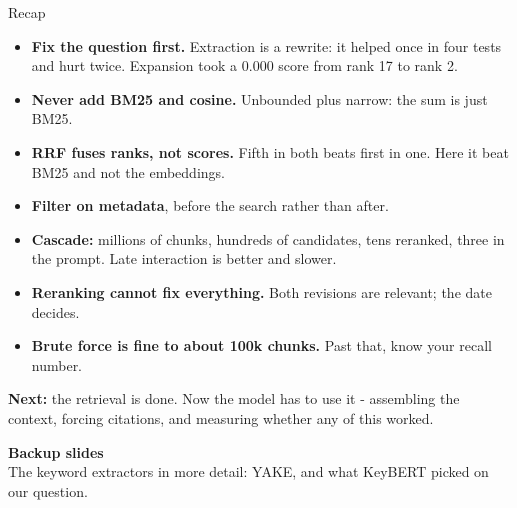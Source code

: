 \documentclass[aspectratio=169]{beamer}
\newcommand{\takebox}[1]{%
  \begin{tcolorbox}[colback=paramgreen!8, colframe=paramgreen, boxrule=0.6pt, arc=2pt]
  #1
  \end{tcolorbox}}
\newcommand{\sectiontransition}[2]{%
  \begin{frame}[plain]
    \vfill
    \begin{center}
      {\Huge\bfseries\color{popblue} #1}\\[1.1em]
      {\large #2}
    \end{center}
    \vfill
  \end{frame}}
\begin{document}
\begin{frame}{Recap}
  \begin{itemize}
    \item \textbf{Fix the question first.} Extraction is a rewrite: it helped once in four
      tests and hurt twice. Expansion took a 0.000 score from rank 17 to rank 2.
    \item \textbf{Never add BM25 and cosine.} Unbounded plus narrow: the sum is just BM25.
    \item \textbf{RRF fuses ranks, not scores.} Fifth in both beats first in one. Here it
      beat BM25 and not the embeddings.
    \item \textbf{Filter on metadata}, before the search rather than after.
    \item \textbf{Cascade:} millions of chunks, hundreds of candidates, tens reranked, three
      in the prompt. Late interaction is better and slower.
    \item \textbf{Reranking cannot fix everything.} Both revisions are relevant; the date decides.
    \item \textbf{Brute force is fine to about 100k chunks.} Past that, know your recall
      number.
  \end{itemize}

  \vspace{0.3em}
  \takebox{\textbf{Next:} the retrieval is done. Now the model has to use it - assembling
  the context, forcing citations, and measuring whether any of this worked.}
\end{frame}


\appendix
\sectiontransition{Backup slides}{The keyword extractors in more detail: YAKE, and
what KeyBERT picked on our question.}
\end{document}
